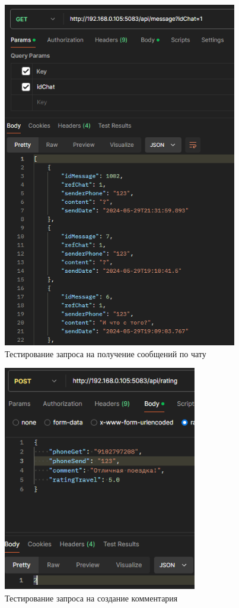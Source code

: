 \begin{figure}[H]
	\centering
	\includegraphics[width=0.8\linewidth]{images/test10}
	\caption{Тестирование запроса на получение сообщений по чату}
	\label{fig:test10}
\end{figure}

\begin{figure}[H]
	\centering
	\includegraphics[width=0.7\linewidth]{images/test11}
	\caption{Тестирование запроса на создание комментария}
	\label{fig:test11}
\end{figure}
